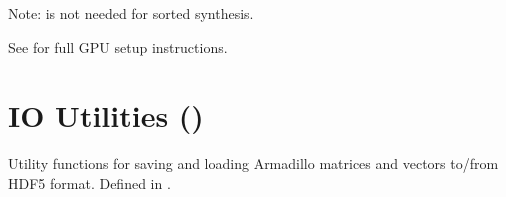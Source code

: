 \documentclass[a4paper,10pt,english]{sphinxmanual}
\begin{document}
\sphinxAtStartPar
Note:  is not needed for sorted synthesis.

\sphinxAtStartPar
See {\hyperref[\detokenize{getting-started/gpu::doc}]{}} for full GPU setup instructions.

\sphinxstepscope


\section{IO Utilities ()}
\label{\detokenize{api/io-utils:io-utilities-impact-io}}\label{\detokenize{api/io-utils::doc}}
\sphinxAtStartPar
Utility functions for saving and loading Armadillo matrices and vectors to/from
HDF5 format. Defined in .
\end{document}
